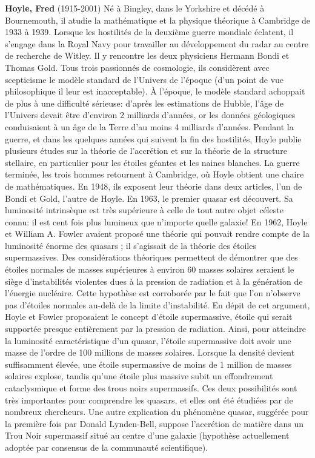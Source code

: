 \textbf{Hoyle, Fred} (1915-2001) Né à Bingley, dans le Yorkshire et décédé à Bournemouth, il atudie la mathématique et la physique théorique à Cambridge de 1933 à 1939. Lorsque les hostilités de la deuxième guerre mondiale éclatent, il s'engage dans la Royal Navy pour travailler au développement du radar au centre de recherche de Witley. Il y rencontre les deux physiciens Hermann Bondi et Thomas Gold. Tous trois passionnés de cosmologie, ils considèrent avec scepticisme le modèle standard de l'Univers de l'époque (d'un point de vue philosophique il leur est inacceptable). À l'époque, le modèle standard achoppait de plus à une difficulté sérieuse: d'après les estimations de Hubble, l'âge de l'Univers devait être d'environ 2 milliards d'années, or les données géologiques conduisaient à un âge de la Terre d'au moins 4 milliards d'années. Pendant la guerre, et dans les quelques années qui suivent la fin des hostilités, Hoyle publie plusieurs études sur la théorie de l'accrétion et sur la théorie de la structure stellaire, en particulier pour les étoiles géantes et les naines blanches. La guerre terminée, les trois hommes retournent à Cambridge, où Hoyle obtient une chaire de mathématiques. En 1948, ils exposent leur théorie dans deux articles, l'un de Bondi et Gold, l'autre de Hoyle. En 1963, le premier quasar est découvert. Sa luminosité intrinsèque est très supérieure à celle de tout autre objet céleste connu: il est cent fois plus lumineux que n'importe quelle galaxie! En 1962, Hoyle et William A. Fowler avaient proposé une théorie qui pouvait rendre compte de la luminosité énorme des quasars ; il s'agissait de la théorie des étoiles supermassives. Des considérations théoriques permettent de démontrer que des étoiles normales  de masses supérieures à environ 60 masses solaires seraient le siège d'instabilités violentes dues à la pression de radiation et à la génération de l'énergie nucléaire. Cette hypothèse est corroborée par le fait que l'on n'observe pas d'étoiles normales au-delà de la limite d'instabilité. En dépit de cet argument, Hoyle et Fowler proposaient le concept d'étoile supermassive, étoile qui serait supportée presque entièrement par la pression de radiation. Ainsi, pour atteindre la luminosité caractéristique d'un quasar, l'étoile supermassive doit avoir une masse de l'ordre de 100 millions de masses solaires. Lorsque la densité devient suffisamment élevée, une étoile supermassive de moins de 1 million de masses solaires explose, tandis qu'une étoile plus massive subit un effondrement cataclysmique et forme des trous noirs supermassifs. Ces deux possibilités sont très importantes pour comprendre les quasars, et elles ont été étudiées par de nombreux chercheurs. Une autre explication du phénomène quasar, suggérée pour la première fois par Donald Lynden-Bell, suppose l'accrétion de matière dans un Trou Noir supermassif situé au centre d'une galaxie (hypothèse actuellement adoptée par consensus de la communauté scientifique).

